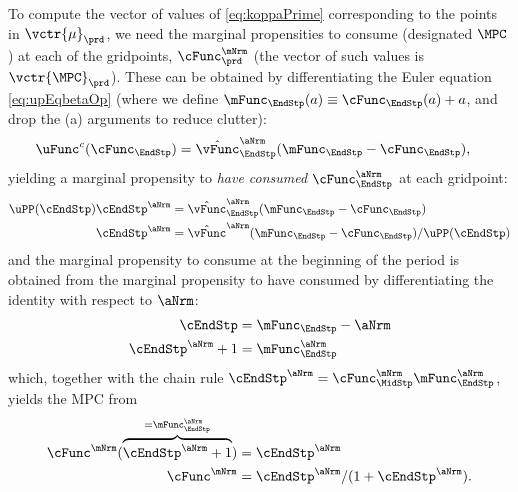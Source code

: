To compute the vector of values of \eqref{eq:koppaPrime} corresponding
to the points in $\vctr{\mu}_{\prd}$, we need the marginal propensities to
consume (designated $\MPC$) at each of the gridpoints,
$\cFunc^{\mNrm}_{\prd}$ (the vector of such values is
$\vctr{\MPC}_{\prd}$).  These can be obtained by differentiating the
Euler equation \eqref{eq:upEqbetaOp} (where we define
$\mFunc_{\EndStp}(a) \equiv \cFunc_{\EndStp}(a)+{a}$, and drop the (a) arguments to reduce clutter):
\begin{equation}\begin{gathered}\begin{aligned}
      \uFunc^{c}(\cFunc_{\EndStp})   & = \hat{\vFunc}_{\EndStp}^{\aNrm}(\mFunc_{\EndStp}-\cFunc_{\EndStp}),
    \end{aligned}\end{gathered}\end{equation}
yielding a marginal propensity to
\textit{have consumed} $\cFunc_{\EndStp}^{\aNrm}$ at each gridpoint:
\begin{equation}\begin{gathered}\begin{aligned}
      \uPP(\cEndStp)\cEndStp^{\aNrm}  & = \hat{\vFunc}_{\EndStp}^{\aNrm}(\mFunc_{\EndStp}-\cFunc_{\EndStp})
      \\ \cEndStp^{\aNrm}  & = \hat{\vFunc}^{\aNrm}(\mFunc_{\EndStp}-\cFunc_{\EndStp})/\uPP(\cEndStp)
    \end{aligned}\end{gathered}\end{equation}
and the marginal propensity to consume at the beginning of the period is obtained from the marginal propensity to have consumed by differentiating the identity with respect to $\aNrm$:
\begin{equation*}\begin{gathered}\begin{aligned}
      \cEndStp  & = \mFunc_{\EndStp} - \aNrm
      \\ \cEndStp^{\aNrm}+1  & = \mFunc_{\EndStp}^{\aNrm}
    \end{aligned}\end{gathered}\end{equation*}
which, together with the chain rule $\cEndStp^{\aNrm}  = \cFunc^{\mNrm}_{\MidStp}\mFunc_{\EndStp}^{\aNrm}$, yields the MPC from
\begin{equation}\begin{gathered}\begin{aligned}
      \cFunc^{\mNrm}(\overbrace{\cEndStp^{\aNrm}+1}^{=\mFunc_{\EndStp}^{\aNrm}})  & = \cEndStp^{\aNrm}
      \\ \cFunc^{\mNrm}  & = \cEndStp^{\aNrm}/(1+\cEndStp^{\aNrm}) \label{eq:MPCfromMPTHC}.
    \end{aligned}\end{gathered}\end{equation}


